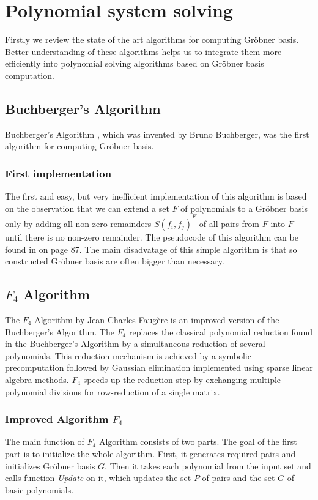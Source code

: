 \chapter{Polynomial system solving}
Firstly we review the state of the art algorithms for computing Gr\"obner basis. Better understanding of these algorithms helps us to integrate them more efficiently into polynomial solving algorithms based on Gr\"obner basis computation.

\section{Buchberger's Algorithm}
Buchberger's Algorithm \cite{Buchberger}, which was invented by Bruno Buchberger, was the first algorithm for computing Gr\"obner basis.

\subsection{First implementation}
The first and easy, but very inefficient implementation of this algorithm is based on the observation that we can extend a set $F$ of polynomials to a Gr\"obner basis only by adding all non-zero remainders $\overline{S(f_i, f_j)}^F$ of all pairs from $F$ into $F$ until there is no non-zero remainder. The pseudocode of this algorithm can be found in \cite{Cox-Little-Shea97} on page 87. The main disadvatage of this simple algorithm is that so constructed Gr\"obner basis are often bigger than necessary.

\section{$F_4$ Algorithm}
The $F_4$ Algorithm \cite{F4} by Jean-Charles Faug\`ere is an improved version of the Buchberger's Algorithm. The $F_4$ replaces the classical polynomial reduction found in the Buchberger's Algorithm by a simultaneous reduction of several polynomials. This reduction mechanism is achieved by a symbolic precomputation followed by Gaussian elimination implemented using sparse linear algebra methods. $F_4$ speeds up the reduction step by exchanging multiple polynomial divisions for row-reduction of a single matrix.

\subsection{Improved Algorithm $F_4$}
The main function of $F_4$ Algorithm consists of two parts. The goal of the first part is to initialize the whole algorithm. First, it generates required pairs and initializes Gr\"obner basis $G$. Then it takes each polynomial from the input set and calls function \textit{Update} on it, which updates the set $P$ of pairs and the set $G$ of basic polynomials.

